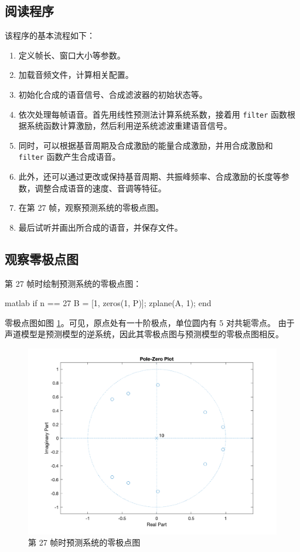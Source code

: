 \documentclass[a4paper]{article}  %
\begin{document}
\subsection{阅读程序}

该程序的基本流程如下：
\begin{enumerate}[i]
    \item 定义帧长、窗口大小等参数。
    \item 加载音频文件，计算相关配置。
    \item 初始化合成的语音信号、合成滤波器的初始状态等。
    \item 依次处理每帧语音。首先用线性预测法计算系统系数，接着用 \texttt{filter} 函数根据系统函数计算激励，然后利用逆系统滤波重建语音信号。
    \item 同时，可以根据基音周期及合成激励的能量合成激励，并用合成激励和 \texttt{filter} 函数产生合成语音。
    \item 此外，还可以通过更改或保持基音周期、共振峰频率、合成激励的长度等参数，调整合成语音的速度、音调等特征。
    \item 在第 27 帧，观察预测系统的零极点图。
    \item 最后试听并画出所合成的语音，并保存文件。
\end{enumerate}

\subsection{观察零极点图}

第 27 帧时绘制预测系统的零极点图：
\begin{codeblock}{matlab}
if n == 27
    B = [1, zeros(1, P)];
    zplane(A, 1); 
end
\end{codeblock}

零极点图如图 \ref{fig:1_3_zplane}。可见，原点处有一十阶极点，单位圆内有 5 对共轭零点。
由于声道模型是预测模型的逆系统，因此其零极点图与预测模型的零极点图相反。

\begin{figure}[ht]
    \centering
    \includegraphics[width=.6\textwidth]{asserts/1_3_zplane.png}
    \caption{
        第 27 帧时预测系统的零极点图
    }\label{fig:1_3_zplane}
\end{figure}
\end{document}

